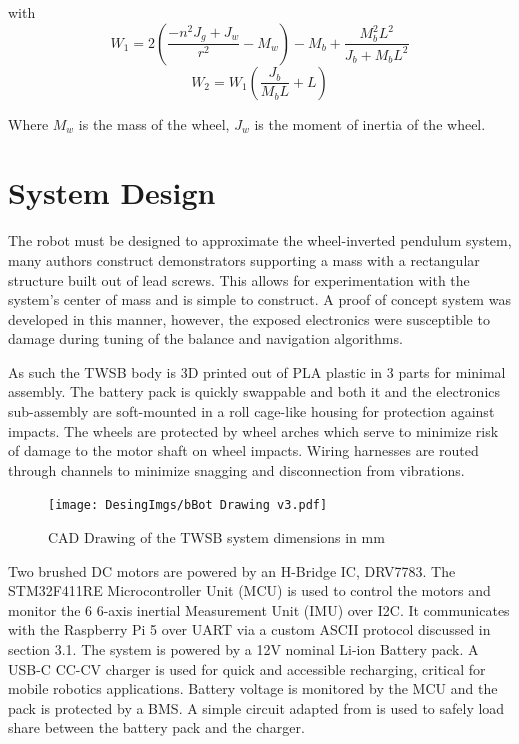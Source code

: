     with 
        \[
    W_1 = 2\left(\frac{-n^2 J_g + J_w }{r^2 } - M_w \right) - M_b + \frac{M_b^2 L^2 }{J_b + M_b L^2 }
        \]
        \[
    W_2 = W_1 \left(\frac{J_b }{M_b L} + L\right)
        \]

    Where $M_w$ is the mass of the wheel, $J_w$ is the moment of inertia of the wheel.
    \pagebreak{}

    \section{System Design}
        The robot must be designed to approximate the wheel-inverted pendulum system, many authors 
        construct demonstrators supporting a mass with a rectangular structure built out of lead screws. 
        This allows for experimentation with the system's center of mass and is simple to construct. 
        A proof of concept system was developed in this manner, however, the exposed electronics were 
        susceptible to damage during tuning of the balance and navigation algorithms.

        As such the TWSB body is 3D printed out of PLA plastic in 3 parts for minimal assembly.
        The battery pack is quickly swappable and both it and the electronics sub-assembly 
        are soft-mounted in a roll cage-like housing for protection against impacts. 
        The wheels are protected by wheel arches which serve to minimize risk of damage to the motor shaft on wheel impacts. 
        Wiring harnesses are routed through channels to minimize snagging and disconnection from vibrations.
        
        \begin{figure}[H]
            \texttt{[image: DesingImgs/bBot Drawing v3.pdf]}
            \caption{CAD Drawing of the TWSB system dimensions in mm}
            \label{fig:CAD}
        \end{figure}

        Two brushed DC motors are powered by an H-Bridge IC, DRV7783. 
        The STM32F411RE Microcontroller Unit (MCU) is used to control the 
        motors and monitor the 6 6-axis inertial Measurement Unit (IMU) over I2C. It communicates with the 
        Raspberry Pi 5 over UART via a custom ASCII protocol discussed in section 3.1. 
        The system is powered by a 12V nominal Li-ion Battery pack. A USB-C CC-CV charger is used for quick 
        and accessible recharging, critical for mobile robotics applications. 
        Battery voltage is monitored by the MCU and the pack is protected by a BMS.
        A simple circuit adapted from \cite{chu2008designing} is used to safely load share between the battery pack and the charger.

